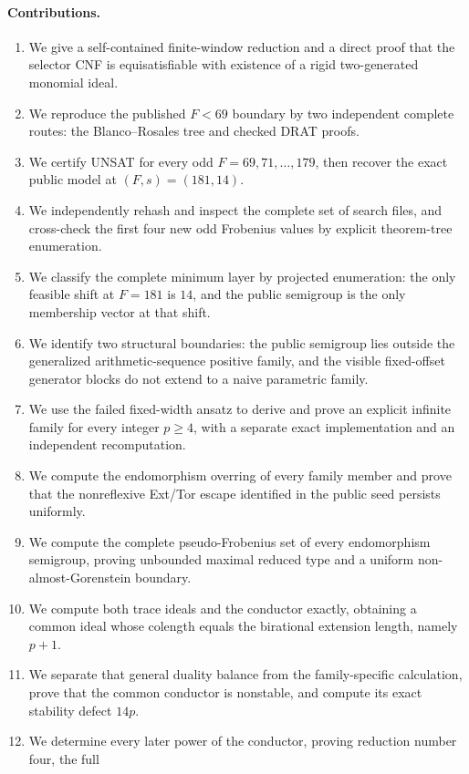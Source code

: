\documentclass[11pt]{article}
\theoremstyle{definition}
\theoremstyle{remark}
\begin{document}
\paragraph{Contributions.}
\begin{enumerate}
  \item We give a self-contained finite-window reduction and a direct proof that the selector CNF is
  equisatisfiable with existence of a rigid two-generated monomial ideal.
  \item We reproduce the published $F<69$ boundary by two independent complete routes: the
  Blanco--Rosales tree and checked DRAT proofs.
  \item We certify UNSAT for every odd $F=69,71,\ldots,179$, then recover the exact public model at
  $(F,s)=(181,14)$.
  \item We independently rehash and inspect the complete set of search files, and cross-check the
  first four new odd Frobenius values by explicit theorem-tree enumeration.
  \item We classify the complete minimum layer by projected enumeration: the only feasible shift
  at $F=181$ is $14$, and the public semigroup is the only membership vector at that shift.
  \item We identify two structural boundaries: the public semigroup lies outside the generalized
  arithmetic-sequence positive family, and the visible fixed-offset generator blocks do not extend
  to a naive parametric family.
  \item We use the failed fixed-width ansatz to derive and prove an explicit infinite family for
  every integer $p\ge4$, with a separate exact implementation and an independent recomputation.
  \item We compute the endomorphism overring of every family member and prove that the
  nonreflexive Ext/Tor escape identified in the public seed persists uniformly.
  \item We compute the complete pseudo-Frobenius set of every endomorphism semigroup, proving
  unbounded maximal reduced type and a uniform non-almost-Gorenstein boundary.
  \item We compute both trace ideals and the conductor exactly, obtaining a common ideal whose
  colength equals the birational extension length, namely $p+1$.
  \item We separate that general duality balance from the family-specific calculation, prove that
  the common conductor is nonstable, and compute its exact stability defect $14p$.
  \item We determine every later power of the conductor, proving reduction number four, the full

\end{enumerate}
\end{document}
